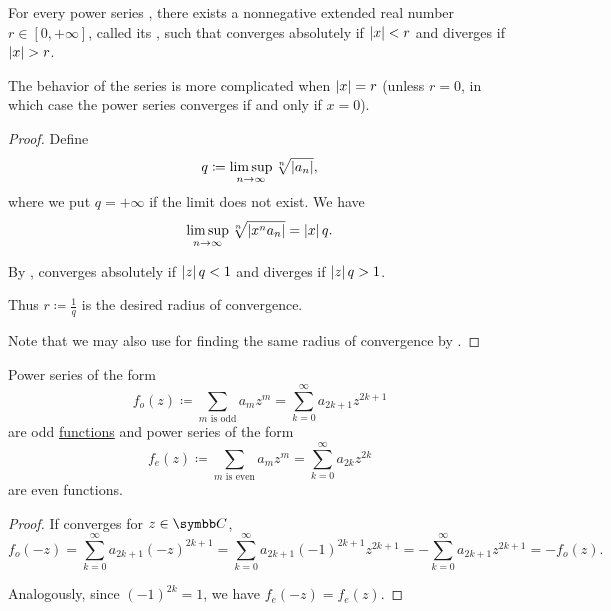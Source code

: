 \begin{theorem}\label{thm:power_series_radius_of_convergence}
  For every power series , there exists a nonnegative extended real number \( r \in [0, +\infty] \), called its , such that  converges absolutely if \( \left\vert x \right\vert < r \) and diverges if \( \left\vert x \right\vert > r \).

  The behavior of the series is more complicated when \( \left\vert x \right\vert = r \) (unless \( r = 0 \), in which case the power series converges if and only if \( x = 0 \)).
\end{theorem}
\begin{proof}
  Define
  \begin{equation*}
    q \coloneqq \limsup_{n \to \infty} \sqrt[n]{\left\vert a_n \right\vert},
  \end{equation*}
  where we put \( q = +\infty \) if the limit does not exist. We have
  \begin{equation*}
    \limsup_{n \to \infty} \sqrt[n]{\left\vert x^n a_n \right\vert} = \left\vert x \right\vert q.
  \end{equation*}

  By ,  converges absolutely if \( \left\vert z \right\vert q < 1 \) and diverges if \( \left\vert z \right\vert q > 1 \).

  Thus \( r \coloneqq \tfrac 1 q \) is the desired radius of convergence.

  Note that we may also use  for finding the same radius of convergence by .
\end{proof}

\begin{proposition}\label{thm:power_series_parity}
  Power series of the form
  \begin{equation}\label{thm:power_series_parity/odd}
    f_o(z) \coloneqq \sum_{m \text{ is odd}} a_m z^m = \sum_{k=0}^\infty a_{2k+1} z^{2k+1}
  \end{equation}
  are odd \hyperref[def:function_pairity]{functions} and power series of the form
  \begin{equation}\label{thm:power_series_parity/even}
    f_e(z) \coloneqq \sum_{m \text{ is even}} a_m z^m = \sum_{k=0}^\infty a_{2k} z^{2k}
  \end{equation}
  are even functions.
\end{proposition}
\begin{proof}
  If  converges for \( z \in \BC \),
  \begin{equation*}
    f_o(-z)
    =
    \sum_{k=0}^\infty a_{2k+1} (-z)^{2k+1}
    =
    \sum_{k=0}^\infty a_{2k+1} (-1)^{2k+1} z^{2k+1}
    =
    - \sum_{k=0}^\infty a_{2k+1} z^{2k+1}
    =
    - f_o(z).
  \end{equation*}

  Analogously, since \( (-1)^{2k} = 1 \), we have \( f_e(-z) = f_e(z) \).
\end{proof}

